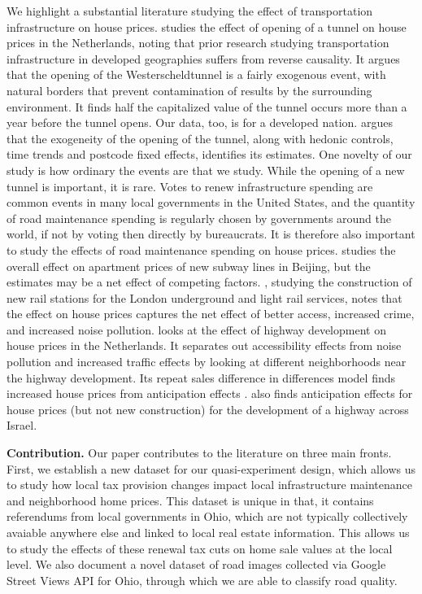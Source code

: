 We highlight a substantial literature studying the effect of transportation infrastructure on house prices. \cite{hoogendoorn2019house} studies the effect of opening of a tunnel on house prices in the Netherlands, noting that prior research studying transportation infrastructure in developed geographies suffers from reverse causality.  It argues that the opening of the Westerscheldtunnel is a fairly exogenous event, with natural borders that prevent contamination of results by the surrounding environment.  It finds half the capitalized value of the tunnel occurs more than a year before the tunnel opens.  Our data, too, is for a developed nation. \cite{hoogendoorn2019house} argues that the exogeneity of the opening of the tunnel, along with hedonic controls, time trends and postcode fixed effects, identifies its estimates.  One novelty of our study is how ordinary the events are that we study.  While the opening of a new tunnel is important, it is rare.  Votes to renew infrastructure spending are common events in many local governments in the United States, and the quantity of road maintenance spending is regularly chosen by governments around the world, if not by voting then directly by bureaucrats.  It is therefore also important to study the effects of road maintenance spending on house prices. \cite{li2016wheels} studies the overall effect on apartment prices of new subway lines in Beijing, but the estimates may be a net effect of competing factors. \cite{gibbons2005valuing}, studying the construction of new rail stations for the London underground and light rail services, notes that the effect on house prices captures the net effect of better access, increased crime, and increased noise pollution. \cite{levkovich2016effects} looks at the effect of highway development on house prices in the Netherlands.  It separates out accessibility effects from noise pollution and increased traffic effects by looking at different neighborhoods near the highway development.  Its repeat sales difference in differences model finds increased house prices from anticipation effects \citep{kohlhase1991impact}. \cite{beenstock2016hedonic} also finds anticipation effects for house prices (but not new construction) for the development of a highway across Israel. 

{\bf Contribution.} Our paper contributes to the literature on three main fronts. First, we establish a new dataset for our quasi-experiment design, which allows us to study how local tax provision changes impact local infrastructure maintenance and neighborhood home prices. This dataset is unique in that, it contains referendums from local governments in Ohio, which are not typically collectively avaiable anywhere else and linked to local real estate information. This allows us to study the effects of these renewal tax cuts on home sale values at the local level. We also document a novel dataset of road images collected via Google Street Views API for Ohio, through which we are able to classify road quality.

